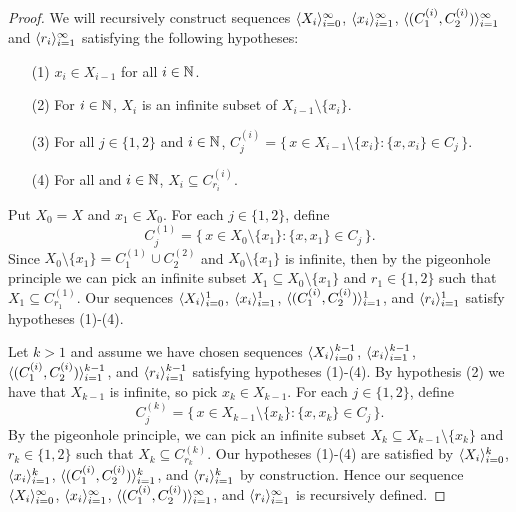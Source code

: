 \documentclass[12pt]{article}
\theoremstyle{plain}
\begin{document}
\begin{proof}
  We will recursively construct sequences $\langle X_i \rangle_{i=0}^\infty$,
  $\langle x_i \rangle_{i=1}^\infty$, $\langle (C_1^{(i)}, C_2^{(i)})
  \rangle_{i=1}^\infty$ and $\langle r_i \rangle_{i=1}^\infty$ satisfying the
  following hypotheses:
  \begin{itemize}
    \item[(1)] $x_i \in X_{i-1}$ for all $i \in \mathbb{N}$.
      
    \item[(2)] For $i \in \mathbb{N}$, $X_i$ is an infinite subset of
      $X_{i-1} \setminus \{x_i\}$.

    \item[(3)] For all $j \in \{1, 2\}$ and $i \in \mathbb{N}$, $C_j^{(i)} =
      \bigl\{\, x \in X_{i-1} \setminus \{x_i\} : \{x, x_i\} \in C_j
      \,\bigr\}$.

    \item[(4)] For all and $i \in \mathbb{N}$, $X_i
      \subseteq C_{r_i}^{(i)}$.
  \end{itemize}
  
  Put $X_0 = X$ and $x_1 \in X_0$.
  For each $j \in \{1,2\}$, define
  \[
    C_j^{(1)} = \bigl\{\, x \in X_0 \setminus \{x_1\} : \{x, x_1\} \in
    C_j \,\bigr\}.
  \]
  Since $X_0 \setminus \{x_1\} = C_1^{(1)} \cup C_2^{(2)}$ and $X_0
  \setminus \{x_1\}$ is infinite, then by the pigeonhole principle we
  can pick an infinite subset $X_1 \subseteq X_0 \setminus \{x_1\}$
  and $r_1 \in \{1, 2\}$ such that $X_1 \subseteq C_{r_1}^{(1)}$.
  Our sequences $\langle X_i \rangle_{i=0}^1$, $\langle x_i \rangle_{i=1}^1$, $\langle
  (C_1^{(i)}, C_2^{(i)}) \rangle_{i=1}^1$, and $\langle r_i \rangle_{i=1}^1$
  satisfy hypotheses (1)-(4).

  Let $k > 1$ and assume we have chosen sequences $\langle X_i
  \rangle_{i=0}^{k-1}$, $\langle x_i \rangle_{i=1}^{k-1}$, $\langle (C_1^{(i)}, C_2^{(i)})
  \rangle_{i=1}^{k-1}$, and $\langle r_i \rangle_{i=1}^{k-1}$ satisfying
  hypotheses (1)-(4).
  By hypothesis (2) we have that $X_{k-1}$ is infinite, so pick $x_k
  \in X_{k-1}$.
  For each $j \in \{1, 2\}$, define
  \[
    C_j^{(k)} = \bigl\{\, x \in X_{k-1} \setminus \{x_k\} : \{x, x_k\} \in
    C_j \,\bigr\}.
  \]
  By the pigeonhole principle, we can pick an infinite subset $X_k
  \subseteq X_{k-1} \setminus \{x_k\}$ and $r_k \in \{1, 2\}$ such
  that $X_k \subseteq C_{r_k}^{(k)}$.
  Our hypotheses (1)-(4) are satisfied by $\langle X_i
  \rangle_{i=0}^{k}$, $\langle x_i \rangle_{i=1}^{k}$, $\langle (C_1^{(i)}, C_2^{(i)})
  \rangle_{i=1}^{k}$, and $\langle r_i \rangle_{i=1}^{k}$ by construction. 
  Hence our sequence $\langle X_i \rangle_{i=0}^{\infty}$, $\langle x_i
  \rangle_{i=1}^{\infty}$, $\langle (C_1^{(i)}, C_2^{(i)}) \rangle_{i=1}^{\infty}$, and
  $\langle r_i \rangle_{i=1}^{\infty}$ is recursively defined.


\end{proof}
\end{document}

